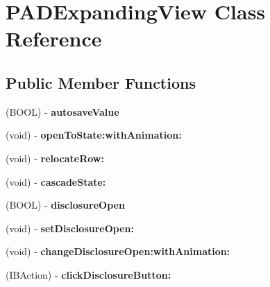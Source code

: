 \hypertarget{interface_p_a_d_expanding_view}{
\section{PADExpandingView Class Reference}
\label{interface_p_a_d_expanding_view}
}
\subsection*{Public Member Functions}
\begin{DoxyCompactItemize}
\item 
\hypertarget{interface_p_a_d_expanding_view_aca1a87dc4cd16d6fb0518fbfa1a0fbb0}{
(BOOL) -\/ {\bfseries autosaveValue}}
\label{interface_p_a_d_expanding_view_aca1a87dc4cd16d6fb0518fbfa1a0fbb0}

\item 
\hypertarget{interface_p_a_d_expanding_view_adc2379653a13f30b8a34397a05452578}{
(void) -\/ {\bfseries openToState:withAnimation:}}
\label{interface_p_a_d_expanding_view_adc2379653a13f30b8a34397a05452578}

\item 
\hypertarget{interface_p_a_d_expanding_view_a29cb64ce283a39db955357623d59c260}{
(void) -\/ {\bfseries relocateRow:}}
\label{interface_p_a_d_expanding_view_a29cb64ce283a39db955357623d59c260}

\item 
\hypertarget{interface_p_a_d_expanding_view_a28dccaa3c39277fcdf28584c0c884db5}{
(void) -\/ {\bfseries cascadeState:}}
\label{interface_p_a_d_expanding_view_a28dccaa3c39277fcdf28584c0c884db5}

\item 
\hypertarget{interface_p_a_d_expanding_view_a44f7d87e73e9cd0b82be51326ea8662f}{
(BOOL) -\/ {\bfseries disclosureOpen}}
\label{interface_p_a_d_expanding_view_a44f7d87e73e9cd0b82be51326ea8662f}

\item 
\hypertarget{interface_p_a_d_expanding_view_a430b46621823aabfce927dbd9445b7dc}{
(void) -\/ {\bfseries setDisclosureOpen:}}
\label{interface_p_a_d_expanding_view_a430b46621823aabfce927dbd9445b7dc}

\item 
\hypertarget{interface_p_a_d_expanding_view_a550154a72037e0156f9d1f4360df1de7}{
(void) -\/ {\bfseries changeDisclosureOpen:withAnimation:}}
\label{interface_p_a_d_expanding_view_a550154a72037e0156f9d1f4360df1de7}

\item 
\hypertarget{interface_p_a_d_expanding_view_adc3094f2a51ba443f9583a5e88b67db0}{
(IBAction) -\/ {\bfseries clickDisclosureButton:}}
\label{interface_p_a_d_expanding_view_adc3094f2a51ba443f9583a5e88b67db0}

\end{DoxyCompactItemize}
